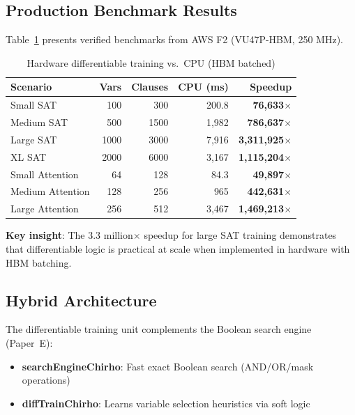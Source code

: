 \documentclass[11pt,a4paper]{article}
\begin{document}
\subsection{Production Benchmark Results}
\label{subsec:hw_benchmarks_chirho}

Table~\ref{tab:hw_benchmarks_chirho} presents verified benchmarks from AWS F2 (VU47P-HBM, 250 MHz).

\begin{table}[ht]
\centering
\caption{Hardware differentiable training vs.\ CPU (HBM batched)}
\label{tab:hw_benchmarks_chirho}
\begin{tabular}{lrrrr}
\toprule
\textbf{Scenario} & \textbf{Vars} & \textbf{Clauses} & \textbf{CPU (ms)} & \textbf{Speedup} \\
\midrule
Small SAT & 100 & 300 & 200.8 & \textbf{76,633$\times$} \\
Medium SAT & 500 & 1500 & 1,982 & \textbf{786,637$\times$} \\
Large SAT & 1000 & 3000 & 7,916 & \textbf{3,311,925$\times$} \\
XL SAT & 2000 & 6000 & 3,167 & \textbf{1,115,204$\times$} \\
\midrule
Small Attention & 64 & 128 & 84.3 & \textbf{49,897$\times$} \\
Medium Attention & 128 & 256 & 965 & \textbf{442,631$\times$} \\
Large Attention & 256 & 512 & 3,467 & \textbf{1,469,213$\times$} \\
\bottomrule
\end{tabular}
\end{table}

\textbf{Key insight}: The 3.3 million$\times$ speedup for large SAT training
demonstrates that differentiable logic is practical at scale when implemented
in hardware with HBM batching.

\subsection{Hybrid Architecture}
\label{subsec:hybrid_chirho}

The differentiable training unit complements the Boolean search engine (Paper~E):

\begin{itemize}
  \item \textbf{searchEngineChirho}: Fast exact Boolean search (AND/OR/mask operations)
  \item \textbf{diffTrainChirho}: Learns variable selection heuristics via soft logic
\end{itemize}
\end{document}
